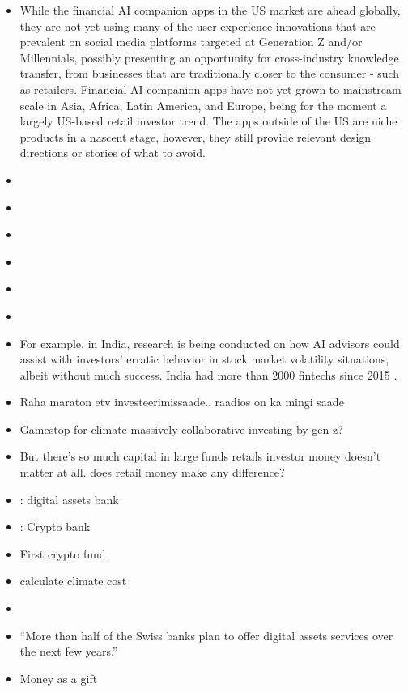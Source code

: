 \documentclass[
  letterpaper,
  DIV=11,
  numbers=noendperiod]{scrartcl}
\begin{document}
\begin{itemize}
\item
  While the financial AI companion apps in the US market are ahead
  globally, they are not yet using many of the user experience
  innovations that are prevalent on social media platforms targeted at
  Generation Z and/or Millennials, possibly presenting an opportunity
  for cross-industry knowledge transfer, from businesses that are
  traditionally closer to the consumer - such as retailers. Financial AI
  companion apps have not yet grown to mainstream scale in Asia, Africa,
  Latin America, and Europe, being for the moment a largely US-based
  retail investor trend. The apps outside of the US are niche products
  in a nascent stage, however, they still provide relevant design
  directions or stories of what to avoid.
\item
  \citet{WhyDesignKey2021}
\item
  \citet{seanmcgowanUXDesignFinTech2018}
\item
  \citet{robindhanwaniFintechUIUX2021}
\item
  \citet{DesigningFintechApp2021}
\item
  \citet{cordeiroDesignNoLonger2016}
\item
  \citet{ungrammaryProductDesignCase2020}
\item
  \citet{bhatiaRoboAdvisoryIts2020} For example, in India, research is
  being conducted on how AI advisors could assist with investors'
  erratic behavior in stock market volatility situations, albeit without
  much success. India had more than 2000 fintechs since 2015
  \citep{migozziYouShouldWhat2023}.
\item
  Raha maraton etv investeerimissaade.. raadios on ka mingi saade
\item
  Gamestop for climate massively collaborative investing by gen-z?
\item
  But there's so much capital in large funds retails investor money
  doesn't matter at all. does retail money make any difference?
\item
  \citet{EmpoweringDigitalAsset}: digital assets bank
\item
  \citet{BankNewEconomy}: Crypto bank
\item
  \citet{finmaApprovalFirstSwiss2021} First crypto fund
\item
  \citet{MyclimateYourPartner2023} calculate climate cost
\item
  \citet{GreenCentralBanking}
\item
  \citet{swissinfo.ch/ursSwissCryptoValley2022} ``More than half of the
  Swiss banks plan to offer digital assets services over the next few
  years.''
\item
  \citet{hydeGiftHowCreative2006} Money as a gift
\end{itemize}
\end{document}
